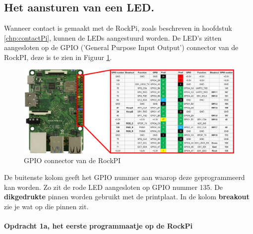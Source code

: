 \subsection{Het aansturen van een LED.}
Wanneer contact is gemaakt met de RockPi, zoals beschreven in hoofdstuk \ref{chp:contactPi}, kunnen de LEDs aangestuurd worden. De LED's zitten aangesloten op de GPIO ('General Purpose Input Output') connector van de RockPI, deze is te zien in Figuur \ref{fig:rockpiCon}.
\begin{figure}[h!]
	\centering
	\begin{center} 	
		\includegraphics[width=1.1\textwidth]{figuren/rockpi-connector}
		\caption{GPIO connector van de RockPI}
		\label{fig:rockpiCon}   
	\end{center}
\end{figure}
De buitenste kolom geeft het GPIO nummer aan waarop deze geprogrammeerd kan worden. Zo zit de rode LED aangesloten op GPIO nummer 135. De \textbf{dikgedrukte} pinnen worden gebruikt met de printplaat. In de kolom \textbf{breakout} zie je wat op die pinnen zit.

\paragraph[Opdracht 1a]{Opdracht 1a, het eerste programmaatje op de RockPi}	

